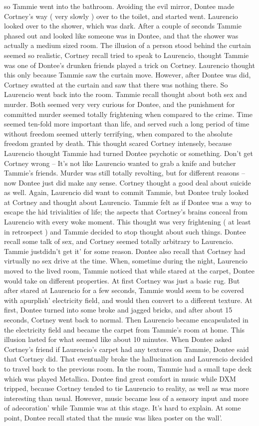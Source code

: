 \documentclass[12pt]{book}
\begin{document}
so Tammie went into the bathroom. Avoiding the evil mirror, Dontee made Cortney's way ( very slowly ) over to the toilet, and started went. Laurencio looked over to the shower, which was dark. After a couple of seconds Tammie phased out and looked like someone was in Dontee, and that the shower was actually a medium sized room. The illusion of a person stood behind the curtain seemed so realistic, Cortney recall tried to speak to Laurencio, thought Tammie was one of Dontee's drunken friends played a trick on Cortney. Laurencio thought this only because Tammie saw the curtain move. However, after Dontee was did, Cortney swatted at the curtain and saw that there was nothing there. So Laurencio went back into the room. Tammie recall thought about both sex and murder. Both seemed very very curious for Dontee, and the punishment for committed murder seemed totally frightening when compared to the crime. Time seemed ten-fold more important than life, and served such a long period of time without freedom seemed utterly terrifying, when compared to the absolute freedom granted by death. This thought scared Cortney intensely, because Laurencio thought Tammie had turned Dontee psychotic or something. Don't get Cortney wrong -- It's not like Laurencio wanted to grab a knife and butcher Tammie's friends. Murder was still totally revolting, but for different reasons -- now Dontee just did make any sense. Cortney thought a good deal about suicide as well. Again, Laurencio did want to commit Tammie, but Dontee truly looked at Cortney and thought about Laurencio. Tammie felt as if Dontee was a way to escape the hid trivialities of life; the aspects that Cortney's brains conceal from Laurencio with every woke moment. This thought was very frightening ( at least in retrospect ) and Tammie decided to stop thought about such things. Dontee recall some talk of sex, and Cortney seemed totally arbitrary to Laurencio. Tammie justdidn't get it' for some reason. Dontee also recall that Cortney had virtually no sex drive at the time. When, sometime during the night, Laurencio moved to the lived room, Tammie noticed that while stared at the carpet, Dontee would take on different properties. At first Cortney was just a basic rug. But after stared at Laurencio for a few seconds, Tammie would seem to be covered with apurplish' electricity field, and would then convert to a different texture. At first, Dontee turned into some broke and jagged bricks, and after about 15 seconds, Cortney went back to normal. Then Laurencio became encapsulated in the electricity field and became the carpet from Tammie's room at home. This illusion lasted for what seemed like about 10 minutes. When Dontee asked Cortney's friend if Laurencio's carpet had any textures on Tammie, Dontee said that Cortney did. That eventually broke the hallucination and Laurencio decided to travel back to the previous room. In the room, Tammie had a small tape deck which was played Metallica. Dontee find great comfort in music while DXM tripped, because Cortney tended to tie Laurencio to reality, as well as was more interesting than usual. However, music became less of a sensory input and more of adecoration' while Tammie was at this stage. It's hard to explain. At some point, Dontee recall stated that the music was likea poster on the wall'. 
\end{document}
